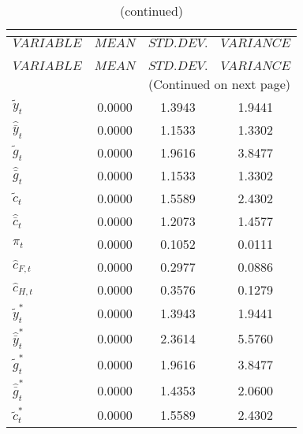  
\begin{center}
\begin{longtable}{lccc} 
\caption{THEORETICAL MOMENTS}\\
 \label{Table:th_moments}\\
\toprule 
$VARIABLE             $	 & 	 $         MEAN$	 & 	 $    STD. DEV.$	 & 	 $     VARIANCE$\\
\midrule \endfirsthead 
\caption{(continued)}\\
 \toprule \\ 
$VARIABLE             $	 & 	 $         MEAN$	 & 	 $    STD. DEV.$	 & 	 $     VARIANCE$\\
\midrule \endhead 
\midrule \multicolumn{4}{r}{(Continued on next page)} \\ \bottomrule \endfoot 
\bottomrule \endlastfoot 
${\tilde y_t}         $	 & 	       0.0000	 & 	       1.3943	 & 	       1.9441 \\ 
${\hat {\bar y}_t}    $	 & 	       0.0000	 & 	       1.1533	 & 	       1.3302 \\ 
${\tilde g_t}         $	 & 	       0.0000	 & 	       1.9616	 & 	       3.8477 \\ 
${\hat {\bar g}_t}    $	 & 	       0.0000	 & 	       1.1533	 & 	       1.3302 \\ 
${\tilde c_t}         $	 & 	       0.0000	 & 	       1.5589	 & 	       2.4302 \\ 
${\hat {\bar c}_t}    $	 & 	       0.0000	 & 	       1.2073	 & 	       1.4577 \\ 
${\pi_t}              $	 & 	       0.0000	 & 	       0.1052	 & 	       0.0111 \\ 
${\hat c_{F,t}}       $	 & 	       0.0000	 & 	       0.2977	 & 	       0.0886 \\ 
${\hat c_{H,t}}       $	 & 	       0.0000	 & 	       0.3576	 & 	       0.1279 \\ 
${\tilde y_t^*}       $	 & 	       0.0000	 & 	       1.3943	 & 	       1.9441 \\ 
${\hat {\bar y}_t^*}  $	 & 	       0.0000	 & 	       2.3614	 & 	       5.5760 \\ 
${\tilde g_t^*}       $	 & 	       0.0000	 & 	       1.9616	 & 	       3.8477 \\ 
${\hat {\bar g}_t^*}  $	 & 	       0.0000	 & 	       1.4353	 & 	       2.0600 \\ 
${\tilde c_t^*}       $	 & 	       0.0000	 & 	       1.5589	 & 	       2.4302 \\ 

\end{longtable}
\end{center}
